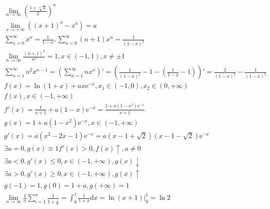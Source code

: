 \documentclass{article}
\begin{document}
\clearpage
\begin{align*}
    \lim_{n \to \infty}\left(\frac{1+\sqrt[n]{3}}{2}\right)^{n} \\ 
    \lim_{x \to +\infty}\left(\left(x+1\right)^a-x^a\right) = a \\
    \sum_{n=0}^{\infty} x^{n} = \frac{1}{1-x} , \sum_{n=0}^{\infty} (n+1)x^{n} = \frac{1}{(1-x)^2}\\
    \lim_{n \to \infty} \frac{(n+1)^2}{n^2} = 1 , x \in (-1,1),x \neq \pm 1 \\
    \sum_{n=1}^{\infty} n^2x^{n-1} = \left(\sum_{n=1}^{\infty}nx^{n}\right)' = \left(\frac{1}{(1-x)^2}-1-\left(\frac{1}{1-x}-1\right)\right)' = \frac{2}{(1-x)^3}-\frac{1}{(1-x)^2} \\ 
    f(x) = \ln(1+x) + ax\mathrm{e}^{-x} ,x_{1}\in(-1,0),x_{2} \in (0,+\infty) \\
    f(x) , x \in (-1,+\infty) \\ 
    f'(x) = \frac{1}{x+1}+a(1-x)\mathrm{e}^{-x} = \frac{1+a(1-x^2)\mathrm{e}^{-x}}{x+1} \\
    g(x) = 1+a(1-x^2)\mathrm{e}^{-x} , x \in (-1,+\infty) \\ 
    g'(x) = a(x^2-2x-1)\mathrm{e}^{-x} = a(x-1+\sqrt{2})(x-1-\sqrt{2})\mathrm{e}^{-x} \\
    \exists a = 0 , g(x) \equiv 1 f'(x) > 0 , f(x) \uparrow,a \neq 0 \\ 
    \exists a < 0,g'(x) \le 0 , x \in (-1,+\infty),g(x) \downarrow \\    
    \exists a > 0,g'(x) \ge 0 , x \in (-1,+\infty),g(x) \uparrow \\
    g(-1) = 1,g(0)=1+a,g(+\infty) = 1 \\ 
    \lim_{n \to \infty} \frac{1}{n}\sum_{i=1}^{n}\frac{1}{1+\frac{i}{n}} = \int_{0}^{1}\frac{1}{1+x}\mathrm{d}x = \ln(x+1)|_{0}^{1} = \ln 2 \\ 
\end{align*}

\clearpage
\end{document}
